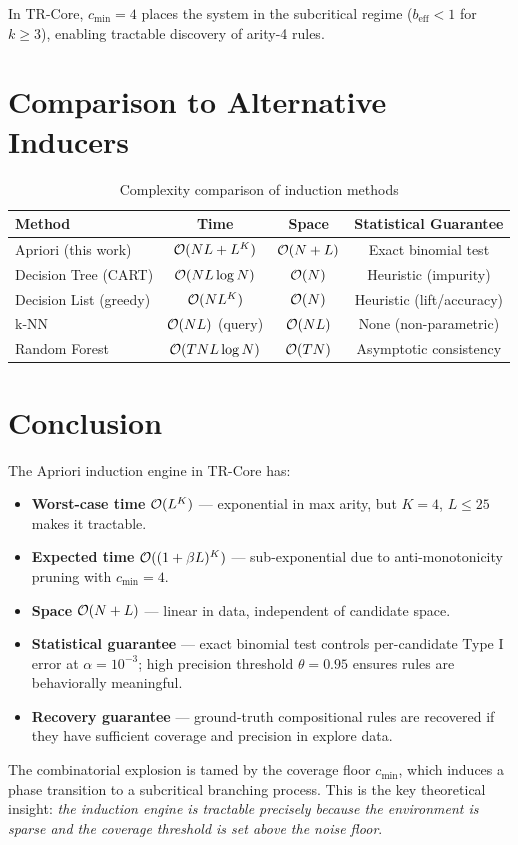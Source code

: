 In TR-Core, $c_{\min}=4$ places the system in the subcritical regime ($b_{\text{eff}} < 1$ for $k \geq 3$), enabling tractable discovery of arity-4 rules.

\section{Comparison to Alternative Inducers}

\begin{table}[htbp]
\centering
\caption{Complexity comparison of induction methods}
\begin{tabular}{lccc}
\toprule
Method & Time & Space & Statistical Guarantee \\
\midrule
Apriori (this work) & $\mathcal{O}(NL + L^K)$ & $\mathcal{O}(N + L)$ & Exact binomial test \\
Decision Tree (CART) & $\mathcal{O}(N L \log N)$ & $\mathcal{O}(N)$ & Heuristic (impurity) \\
Decision List (greedy) & $\mathcal{O}(N L^K)$ & $\mathcal{O}(N)$ & Heuristic (lift/accuracy) \\
k-NN & $\mathcal{O}(N L)$ (query) & $\mathcal{O}(N L)$ & None (non-parametric) \\
Random Forest & $\mathcal{O}(T N L \log N)$ & $\mathcal{O}(T N)$ & Asymptotic consistency \\
\bottomrule
\end{tabular}
\end{table}

\section{Conclusion}

The Apriori induction engine in TR-Core has:
\begin{itemize}
    \item \textbf{Worst-case time} $\mathcal{O}(L^K)$ — exponential in max arity, but $K=4$, $L \leq 25$ makes it tractable.
    \item \textbf{Expected time} $\mathcal{O}((1+\beta L)^K)$ — sub-exponential due to anti-monotonicity pruning with $c_{\min}=4$.
    \item \textbf{Space} $\mathcal{O}(N + L)$ — linear in data, independent of candidate space.
    \item \textbf{Statistical guarantee} — exact binomial test controls per-candidate Type I error at $\alpha=10^{-3}$; high precision threshold $\theta=0.95$ ensures rules are behaviorally meaningful.
    \item \textbf{Recovery guarantee} — ground-truth compositional rules are recovered if they have sufficient coverage and precision in explore data.
\end{itemize}

The combinatorial explosion is tamed by the coverage floor $c_{\min}$, which induces a phase transition to a subcritical branching process. This is the key theoretical insight: \emph{the induction engine is tractable precisely because the environment is sparse and the coverage threshold is set above the noise floor}.

